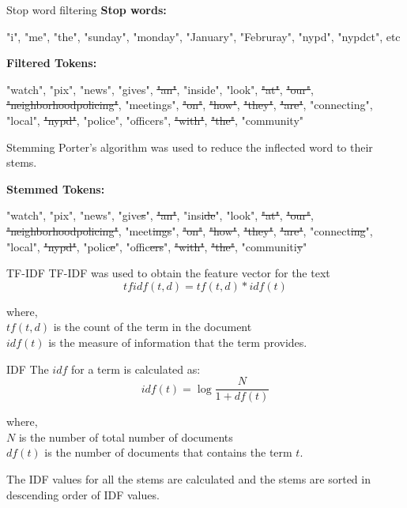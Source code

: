 \documentclass[12pt]{beamer}
\begin{document}
\begin{frame}{Stop word filtering}
    \textbf{Stop words:} \par
    "i", "me", "the", "sunday", "monday", "January", "Februray", "nypd", "nypdct", etc \par

    \textbf{Filtered Tokens:} \par
    "watch", "pix", "news", "gives", \sout{"an"}, "inside", "look", \sout{"at"}, \sout{"our"}, \sout{"neighborhoodpolicing"}, "meetings", \sout{"on"}, \sout{"how"}, \sout{"they"}, \sout{"are"}, "connecting", "local", \sout{"nypd"}, "police", "officers", \sout{"with"}, \sout{"the"}, "community"
\end{frame}

\begin{frame}{Stemming}
    Porter's \autocite{porter1980algorithm} algorithm was used to reduce the inflected word to their stems.

    \textbf{Stemmed Tokens:} \par
    "watch", "pix", "news", "give\sout{s}", \sout{"an"}, "insi\sout{de}", "look", \sout{"at"}, \sout{"our"}, \sout{"neighborhoodpolicing"}, "meet\sout{ings}", \sout{"on"}, \sout{"how"}, \sout{"they"}, \sout{"are"}, "connect\sout{ing}", "local", \sout{"nypd"}, "polic\sout{e}", "offic\sout{ers}", \sout{"with"}, \sout{"the"}, "communiti\sout{y}"

\end{frame}

\begin{frame}{TF-IDF}
TF-IDF\autocite{sparck1972statistical} was used to obtain the feature vector for the text
    \begin{equation}
        \label{eq:tf_idf_equation}
        tfidf(t, d) = tf(t, d) * idf(t)
    \end{equation}

    where, \\
    $tf(t, d)$ is the count of the term in the document \\
    $idf(t)$ is the measure of information that the term provides.
\end{frame}

\begin{frame}{IDF}
The $idf$ for a term is calculated as:
\begin{equation}
    \label{eq:idf_equation}
    idf(t) = \log{\frac{N}{1 + df(t)}}
\end{equation}

where, \\
    $N$ is the number of total number of documents \\
    $df(t)$ is the number of documents that contains the term $t$.

The IDF values for all the stems are calculated and the stems are sorted in descending order of IDF values.
\end{frame}
\end{document}
